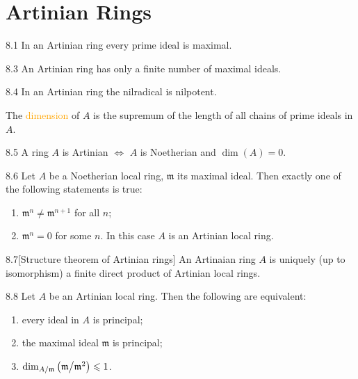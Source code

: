 \chapter{Artinian Rings}

\begin{proposition}{8.1}
	In an Artinian ring every prime ideal is maximal.
\end{proposition}

\begin{proposition}{8.3}
	An Artinian ring has only a finite number of maximal ideals.
\end{proposition}

\begin{proposition}{8.4}
	In an Artinian ring the nilradical is nilpotent.
\end{proposition}

\begin{definition}
	The \textcolor{orange}{dimension} of $A$ is the supremum of the length of all chains of prime ideals in $A$.
\end{definition}

\begin{proposition}{8.5}
	A ring $A$ is Artinian $\Leftrightarrow$ $A$ is Noetherian and $\operatorname{dim}(A)=0$.
\end{proposition}

\begin{proposition}{8.6}
	Let $A$ be a Noetherian local ring, $\mathfrak{m}$ its maximal ideal. Then exactly one of the following statements is true:
	\begin{enumerate}[label=\textup{(\roman*)}]
		\item $\mathfrak{m}^n\neq\mathfrak{m}^{n+1}$ for all $n$;
		\item $\mathfrak{m}^n=0$ for some $n$. In this case $A$ is an Artinian local ring.
	\end{enumerate}
\end{proposition}

\begin{proposition}{8.7}[Structure theorem of Artinian rings]
	An Artinaian ring $A$ is uniquely (up to isomorphism) a finite direct product of Artinian local rings. 
\end{proposition}

\begin{proposition}{8.8}
	Let $A$ be an Artinian local ring. Then the following are equivalent:
	\begin{enumerate}[label=\textup{(\roman*)}]
		\item every ideal in $A$ is principal;
		\item the maximal ideal $\mathfrak{m}$ is principal;
		\item $\operatorname{dim}_{A/\mathfrak{m}}\left(\mathfrak{m}\middle/\mathfrak{m}^2\right)\leqslant1$.
	\end{enumerate}
\end{proposition}